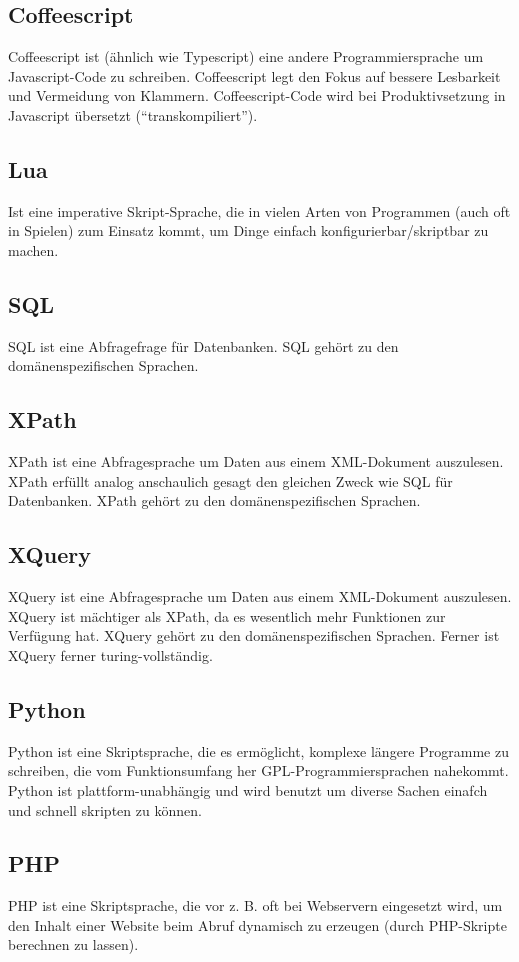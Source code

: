 \begin{multicols}{3}
\subsection{Coffeescript}
Coffeescript ist (ähnlich wie Typescript) eine andere Programmiersprache um Javascript-Code zu schreiben. Coffeescript legt den Fokus auf bessere Lesbarkeit und Vermeidung von Klammern. Coffeescript-Code wird bei Produktivsetzung in Javascript übersetzt (\enquote{transkompiliert}).
\subsection{Lua}
Ist eine imperative Skript-Sprache, die in vielen Arten von Programmen (auch oft in Spielen) zum Einsatz kommt, um Dinge einfach konfigurierbar/skriptbar zu machen.
\subsection{SQL}
SQL ist eine Abfragefrage für Datenbanken. SQL gehört zu den domänenspezifischen Sprachen.
\subsection{XPath}
XPath ist eine Abfragesprache um Daten aus einem XML-Dokument auszulesen. XPath erfüllt analog anschaulich gesagt den gleichen Zweck wie SQL für Datenbanken. XPath gehört zu den domänenspezifischen Sprachen.
\subsection{XQuery}
XQuery ist eine Abfragesprache um Daten aus einem XML-Dokument auszulesen. XQuery ist mächtiger als XPath, da es wesentlich mehr Funktionen zur Verfügung hat. XQuery gehört zu den domänenspezifischen Sprachen. Ferner ist XQuery ferner turing-vollständig.
\subsection{Python}
Python ist eine Skriptsprache, die es ermöglicht, komplexe längere Programme zu schreiben, die vom Funktionsumfang her GPL-Programmiersprachen nahekommt. Python ist plattform-unabhängig und wird benutzt um diverse Sachen einafch und schnell skripten zu können.
\subsection{PHP}
PHP ist eine Skriptsprache, die vor z. B. oft bei Webservern eingesetzt wird, um den Inhalt einer Website beim Abruf dynamisch zu erzeugen (durch PHP-Skripte berechnen zu lassen).

\end{multicols}
